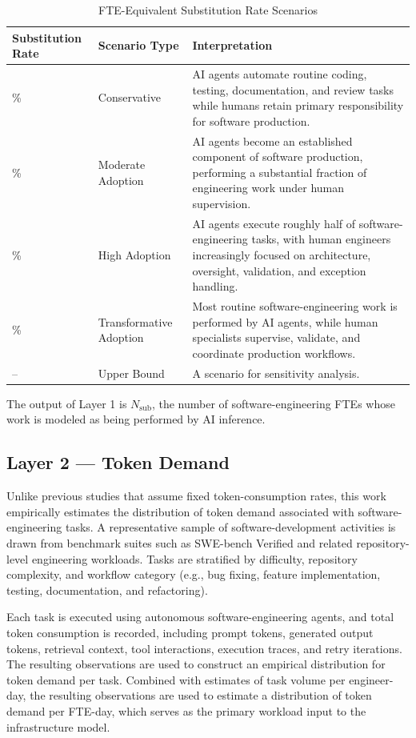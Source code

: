 \documentclass{article}
\begin{document}
\begin{table}[htbp]
\centering
\caption{FTE-Equivalent Substitution Rate Scenarios}
\label{tab:01_ai_scenarios}
\begin{tabular}{>{\centering\arraybackslash}m{2.5cm}
                >{\centering\arraybackslash}m{2.8cm}
                p{8cm}}
\hline
\textbf{Substitution Rate} & \textbf{Scenario Type} & \textbf{Interpretation} \\
\hline
10\% & Conservative &
AI agents automate routine coding, testing, documentation, and review tasks while humans retain primary responsibility for software production. \\
30\% & Moderate Adoption &
AI agents become an established component of software production, performing a substantial fraction of engineering work under human supervision. \\
50\% & High Adoption &
AI agents execute roughly half of software-engineering tasks, with human engineers increasingly focused on architecture, oversight, validation, and exception handling. \\
70\% & Transformative Adoption &
Most routine software-engineering work is performed by AI agents, while human specialists supervise, validate, and coordinate production workflows. \\
-- & Upper Bound &
A scenario for sensitivity analysis. \\
\hline
\end{tabular}
\end{table}

The output of Layer 1 is $N_{\mathrm{sub}}$, the number of software-engineering FTEs whose work is modeled as being performed by AI inference.

\subsection{Layer 2 --- Token Demand}

Unlike previous studies that assume fixed token-consumption rates, this work empirically estimates the distribution of token demand associated with software-engineering tasks. A representative sample of software-development activities is drawn from benchmark suites such as SWE-bench Verified and related repository-level engineering workloads. Tasks are stratified by difficulty, repository complexity, and workflow category (e.g., bug fixing, feature implementation, testing, documentation, and refactoring).

Each task is executed using autonomous software-engineering agents, and total token consumption is recorded, including prompt tokens, generated output tokens, retrieval context, tool interactions, execution traces, and retry iterations. The resulting observations are used to construct an empirical distribution for token demand per task. Combined with estimates of task volume per engineer-day, the resulting observations are used to estimate a distribution of token demand per FTE-day, which serves as the primary workload input to the infrastructure model.
\end{document}
